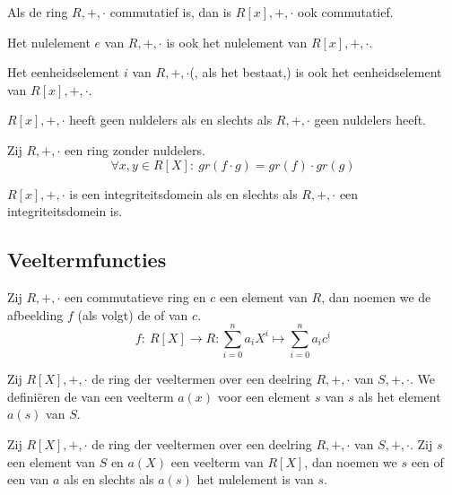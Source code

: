 \documentclass[main.tex]{subfiles}
\begin{document}
\begin{st}
  Als de ring $R,+,\cdot$ commutatief is, dan is $R[x],+,\cdot$ ook commutatief.
\end{st}

\begin{st}
  Het nulelement $e$ van $R,+,\cdot$ is ook het nulelement van $R[x],+,\cdot$.
\end{st}

\begin{st}
  Het eenheidselement $i$ van $R,+,\cdot$(, als het bestaat,) is ook het eenheidselement van $R[x],+,\cdot$.
\end{st}

\begin{st}
  $R[x],+,\cdot$ heeft geen nuldelers als en slechts als $R,+,\cdot$ geen nuldelers heeft.
\end{st}

\begin{ei}
  Zij $R,+,\cdot$ een ring zonder nuldelers.
  \[ \forall x,y \in R[X]:\ gr(f\cdot g) = gr(f) \cdot gr(g) \]
\end{ei}

\begin{gev}
  $R[x],+,\cdot$ is een integriteitsdomein als en slechts als $R,+,\cdot$ een integriteitsdomein is.
\end{gev}


\subsection{Veeltermfuncties}
\label{sec:veeltermfuncties}


\begin{de}
  Zij $R,+,\cdot$ een commutatieve ring en $c$ een element van $R$, dan noemen we de afbeelding $f$ (als volgt) de  of  van $c$.
  \[ f:\ R[X] \rightarrow R: \sum_{i=0}^{n}a_{i}X^{i} \mapsto \sum_{i=0}^{n}a_{i}c^{i} \]
\end{de}

\begin{de}
  Zij $R[X],+,\cdot$ de ring der veeltermen over een deelring $R,+,\cdot$ van $S,+,\cdot$.
  We defini\"eren de  van een veelterm $a(x)$ voor een element $s$ van $s$ als het element $a(s)$ van $S$.
\end{de}

\begin{de}
  Zij $R[X],+,\cdot$ de ring der veeltermen over een deelring $R,+,\cdot$ van $S,+,\cdot$.
  Zij $s$ een element van $S$ en $a(X)$ een veelterm van $R[X]$, dan noemen we $s$ een  of een  van $a$ als en slechts als $a(s)$ het nulelement is van $s$.
\end{de}
\end{document}
